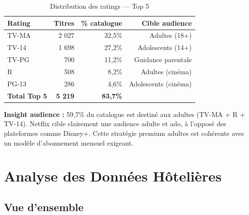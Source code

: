\documentclass[12pt,a4paper]{article}
\begin{document}
\begin{table}[h!]
  \centering
  \caption{Distribution des ratings — Top 5}
  \begin{tabular}{lrrr}
    \toprule
    \textbf{Rating} & \textbf{Titres} & \textbf{\% catalogue} & \textbf{Cible audience} \\
    \midrule
    TV-MA & 2 027 & 32,5\% & Adultes (18+) \\
    TV-14 & 1 698 & 27,2\% & Adolescents (14+) \\
    TV-PG & 700  & 11,2\% & Guidance parentale \\
    R      & 508  &  8,2\% & Adultes (cinéma) \\
    PG-13  & 286  &  4,6\% & Adolescents (cinéma) \\
    \midrule
    \textbf{Total Top 5} & \textbf{5 219} & \textbf{83,7\%} & \\
    \bottomrule
  \end{tabular}
\end{table}

\begin{insightbox}[purple]
  \textbf{Insight audience :} 59,7\% du catalogue est destiné aux adultes (TV-MA + R + TV-14). Netflix cible clairement une audience adulte et ado, à l'opposé des plateformes comme Disney+. Cette stratégie premium adultes est cohérente avec un modèle d'abonnement mensuel exigeant.
\end{insightbox}

\newpage

\section{Analyse des Données Hôtelières}

\subsection{Vue d'ensemble}
\end{document}
